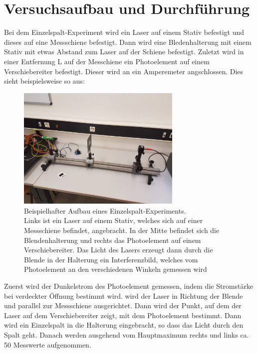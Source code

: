 \section{Versuchsaufbau und Durchführung}
Bei dem Einzelspalt-Experiment wird ein Laser auf einem Stativ befestigt und dieses auf 
eine Messschiene befestigt. Dann wird eine Bledenhalterung mit einem Stativ 
mit etwas Abstand zum Laser auf der Schiene befestigt. Zuletzt wird in einer Entfernung L auf der Messchiene
ein Photoelement auf einem Verschiebereiter befestigt. Dieser wird an ein Amperemeter
angschlossen. Dies sieht beispielsweise so aus:
\begin{figure}[H]
    \centering
    \includegraphics[width=0.7\textwidth]{images/aufbau.jpg}
    \caption{Beispielhafter Aufbau eines Einzelspalt-Experiments.\\
    Links ist ein Laser auf einem Stativ, welches sich auf einer Messschiene befindet, angebracht.
    In der Mitte befindet sich die Blendenhalterung und rechts das Photoelement auf einem 
    Verschiebereiter. Das Licht des Lasers erzeugt dann durch die Blende in der Halterung 
    ein Interferenzbild, welches vom Photoelement an den verschiedenen Winkeln gemessen wird
    }
    \label{fig:3}
\end{figure}
Zuerst wird der Dunkelstrom des Photoelement gemessen, indem die Stromstärke
bei verdeckter Öffnung bestimmt wird.
\justifying wird der Laser in Richtung der Blende und parallel zur Messschiene
ausgerichtet. Dann wird der Punkt, auf dem der Laser auf dem Verschiebereiter zeigt, mit dem
Photoelement bestimmt. Dann wird ein Einzelspalt in die Halterung eingebracht, so dass
das Licht durch den Spalt geht. Danach werden ausgehend vom Hauptmaximum rechts und links 
ca. 50 Messwerte aufgenommen.

